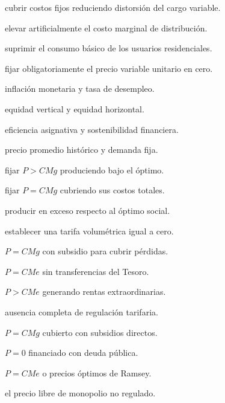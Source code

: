 \begin{opts}
    \item cubrir costos fijos reduciendo distorsión del cargo variable.
    \item elevar artificialmente el costo marginal de distribución.
    \item suprimir el consumo básico de los usuarios residenciales.
    \item fijar obligatoriamente el precio variable unitario en cero.
\end{opts}

\begin{opts}
    \item inflación monetaria y tasa de desempleo.
    \item equidad vertical y equidad horizontal.
    \item eficiencia asignativa y sostenibilidad financiera.
    \item precio promedio histórico y demanda fija.
\end{opts}

\begin{opts}
    \item fijar $P>CMg$ produciendo bajo el óptimo.
    \item fijar $P=CMg$ cubriendo sus costos totales.
    \item producir en exceso respecto al óptimo social.
    \item establecer una tarifa volumétrica igual a cero.
\end{opts}

\begin{opts}
    \item $P=CMg$ con subsidio para cubrir pérdidas.
    \item $P=CMe$ sin transferencias del Tesoro.
    \item $P>CMe$ generando rentas extraordinarias.
    \item ausencia completa de regulación tarifaria.
\end{opts}

\begin{opts}
    \item $P=CMg$ cubierto con subsidios directos.
    \item $P=0$ financiado con deuda pública.
    \item $P=CMe$ o precios óptimos de Ramsey.
    \item el precio libre de monopolio no regulado.
\end{opts}

